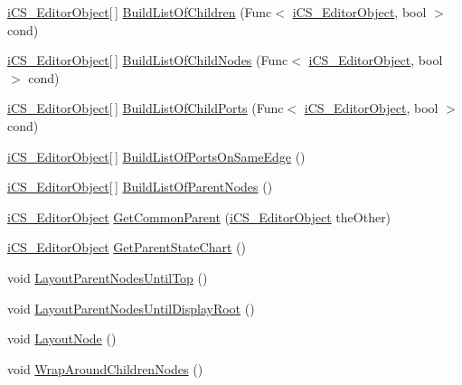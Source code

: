 \begin{DoxyCompactItemize}
\item 
\hyperlink{classi_c_s___editor_object}{i\+C\+S\+\_\+\+Editor\+Object}\mbox{[}$\,$\mbox{]} \hyperlink{classi_c_s___editor_object_a7b1dea6b71b9b50241cd3987afdd1285}{Build\+List\+Of\+Children} (Func$<$ \hyperlink{classi_c_s___editor_object}{i\+C\+S\+\_\+\+Editor\+Object}, bool $>$ cond)
\item 
\hyperlink{classi_c_s___editor_object}{i\+C\+S\+\_\+\+Editor\+Object}\mbox{[}$\,$\mbox{]} \hyperlink{classi_c_s___editor_object_abd614e4766a775247b198fff0e1de391}{Build\+List\+Of\+Child\+Nodes} (Func$<$ \hyperlink{classi_c_s___editor_object}{i\+C\+S\+\_\+\+Editor\+Object}, bool $>$ cond)
\item 
\hyperlink{classi_c_s___editor_object}{i\+C\+S\+\_\+\+Editor\+Object}\mbox{[}$\,$\mbox{]} \hyperlink{classi_c_s___editor_object_a46696cb6a3f541edf6b263cc4af51cee}{Build\+List\+Of\+Child\+Ports} (Func$<$ \hyperlink{classi_c_s___editor_object}{i\+C\+S\+\_\+\+Editor\+Object}, bool $>$ cond)
\item 
\hyperlink{classi_c_s___editor_object}{i\+C\+S\+\_\+\+Editor\+Object}\mbox{[}$\,$\mbox{]} \hyperlink{classi_c_s___editor_object_ae0d02aa27f1ccf98c93079ed69a8d5ee}{Build\+List\+Of\+Ports\+On\+Same\+Edge} ()
\item 
\hyperlink{classi_c_s___editor_object}{i\+C\+S\+\_\+\+Editor\+Object}\mbox{[}$\,$\mbox{]} \hyperlink{classi_c_s___editor_object_aa051a8f0a85c41bfa3e57a24570f3deb}{Build\+List\+Of\+Parent\+Nodes} ()
\item 
\hyperlink{classi_c_s___editor_object}{i\+C\+S\+\_\+\+Editor\+Object} \hyperlink{classi_c_s___editor_object_a986bad0887d815b59b5dcf382920e4ab}{Get\+Common\+Parent} (\hyperlink{classi_c_s___editor_object}{i\+C\+S\+\_\+\+Editor\+Object} the\+Other)
\item 
\hyperlink{classi_c_s___editor_object}{i\+C\+S\+\_\+\+Editor\+Object} \hyperlink{classi_c_s___editor_object_ad0d5dfd9b90a4880e21c5236aab49bb8}{Get\+Parent\+State\+Chart} ()
\item 
void \hyperlink{classi_c_s___editor_object_ab80fe3c2c62d3f21b1c2aa75d96fcb5f}{Layout\+Parent\+Nodes\+Until\+Top} ()
\item 
void \hyperlink{classi_c_s___editor_object_a23c622e858325ae7aedad9668859ad12}{Layout\+Parent\+Nodes\+Until\+Display\+Root} ()
\item 
void \hyperlink{classi_c_s___editor_object_af9593083e592f97e3f92626b0b2d3e3d}{Layout\+Node} ()
\item 
void \hyperlink{classi_c_s___editor_object_a4a6c9e0df898fef397a6cd780b3ac5ff}{Wrap\+Around\+Children\+Nodes} ()

\end{DoxyCompactItemize}

